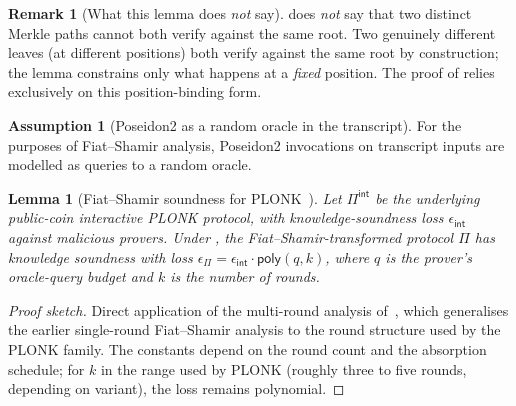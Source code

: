\documentclass[11pt,a4paper]{article}
\theoremstyle{plain}
\newtheorem{lemma}{Lemma}
\theoremstyle{definition}
\newtheorem{assumption}{Assumption}
\newtheorem{remark}{Remark}
\begin{document}
\begin{remark}[What this lemma does \emph{not} say]
\label{rem:merkle-scope}
 does \emph{not} say that two distinct Merkle
paths cannot both verify against the same root. Two genuinely
different leaves (at different positions) both verify against the
same root by construction; the lemma constrains only what happens
at a \emph{fixed} position. The proof of  relies
exclusively on this position-binding form.
\end{remark}

\begin{assumption}[Poseidon2 as a random oracle in the transcript]
\label{ass:p2rom}
For the purposes of Fiat--Shamir analysis, Poseidon2 invocations
on transcript inputs are modelled as queries to a random oracle.
\end{assumption}

\begin{lemma}[Fiat--Shamir soundness for PLONK~\cite{don-2019-fiat-shamir}]
\label{lem:fs}
Let $\Pi^{\mathsf{int}}$ be the underlying public-coin
interactive PLONK protocol, with knowledge-soundness loss
$\epsilon_{\mathsf{int}}$ against malicious provers. Under
, the Fiat--Shamir-transformed protocol $\Pi$ has
knowledge soundness with loss
$\epsilon_{\Pi} = \epsilon_{\mathsf{int}} \cdot \mathsf{poly}(q, k)$,
where $q$ is the prover's oracle-query budget and $k$ is the
number of rounds.
\end{lemma}

\begin{proof}[Proof sketch]
Direct application of the multi-round analysis
of~\cite{don-2019-fiat-shamir}, which generalises the earlier
single-round Fiat--Shamir analysis to the round structure used by
the PLONK family. The constants depend on the round count and
the absorption schedule; for $k$ in the range used by PLONK
(roughly three to five rounds, depending on variant), the loss
remains polynomial.
\end{proof}
\end{document}
